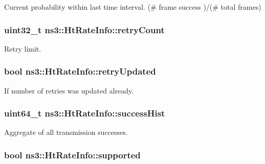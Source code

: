 Current probability within last time interval. (\# frame success )/(\# total frames) 

\subsubsection[{\texorpdfstring{retry\+Count}{retryCount}}]{\setlength{\rightskip}{0pt plus 5cm}uint32\+\_\+t ns3\+::\+Ht\+Rate\+Info\+::retry\+Count}\hypertarget{structns3_1_1HtRateInfo_ae33b54c8cb8ec9da90af5ebcb9e79bb9}{}\label{structns3_1_1HtRateInfo_ae33b54c8cb8ec9da90af5ebcb9e79bb9}


Retry limit. 

\subsubsection[{\texorpdfstring{retry\+Updated}{retryUpdated}}]{\setlength{\rightskip}{0pt plus 5cm}bool ns3\+::\+Ht\+Rate\+Info\+::retry\+Updated}\hypertarget{structns3_1_1HtRateInfo_a92a39b7035f7a75130d3862c864e226b}{}\label{structns3_1_1HtRateInfo_a92a39b7035f7a75130d3862c864e226b}


If number of retries was updated already. 

\subsubsection[{\texorpdfstring{success\+Hist}{successHist}}]{\setlength{\rightskip}{0pt plus 5cm}uint64\+\_\+t ns3\+::\+Ht\+Rate\+Info\+::success\+Hist}\hypertarget{structns3_1_1HtRateInfo_a2e307f392bdaa10602a375cdb9525063}{}\label{structns3_1_1HtRateInfo_a2e307f392bdaa10602a375cdb9525063}


Aggregate of all transmission successes. 

\subsubsection[{\texorpdfstring{supported}{supported}}]{\setlength{\rightskip}{0pt plus 5cm}bool ns3\+::\+Ht\+Rate\+Info\+::supported}\hypertarget{structns3_1_1HtRateInfo_a275d7a8743ff7048490482d3c56d7eb3}{}\label{structns3_1_1HtRateInfo_a275d7a8743ff7048490482d3c56d7eb3}


